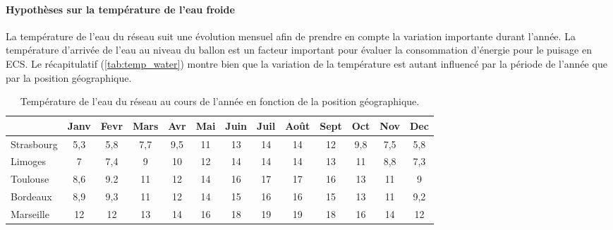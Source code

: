 \paragraph{Hypothèses sur la température de l’eau froide} %
\label{par:hypothèses_sur_la_température_de_l_eau_froide}
La température de l'eau du réseau suit une évolution mensuel afin de prendre en compte
la variation importante durant l’année.
La température d’arrivée de l’eau au niveau du ballon est un facteur important pour
évaluer la consommation d’énergie pour le puisage en ECS. Le récapitulatif (\autoref{tab:temp_water})
montre bien que la variation de la température est autant influencé par la période de l’année
que par la position géographique.
\begin{table}
\centering
\begin{tabular}{l*{12}{c}}
    \toprule
               & Janv & Fevr & Mars & Avr & Mai & Juin & Juil & Août & Sept & Oct & Nov & Dec \\
    \midrule
    Strasbourg & 5,3  & 5,8  & 7,7  & 9,5 & 11  & 13   & 14   & 14   & 12   & 9,8 & 7,5 & 5,8 \\
    Limoges    & 7    & 7,4  & 9    & 10  & 12  & 14   & 14   & 14   & 13   & 11  & 8,8 & 7,3 \\
    Toulouse   & 8,6  & 9.2  & 11   & 12  & 14  & 16   & 17   & 17   & 16   & 13  & 11  & 9   \\
    Bordeaux   & 8,9  & 9,3  & 11   & 12  & 14  & 15   & 16   & 16   & 15   & 13  & 11  & 9,2 \\
    Marseille  & 12   & 12   & 13   & 14  & 16  & 18   & 19   & 19   & 18   & 16  & 14  & 12  \\
    \bottomrule
\end{tabular}
\caption{Température de l'eau du réseau au cours de l'année en fonction de la
         position géographique.}
         \label{tab:temp_water}
\end{table}

